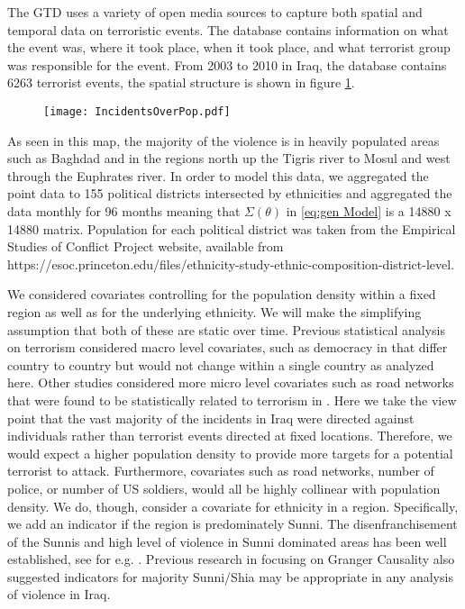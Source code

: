 \documentclass[11pt]{isuthesis}
\begin{document}
The GTD uses a variety of open media sources to capture both spatial and temporal data on terroristic events.  The database contains information on what the event was, where it took place, when it took place, and what terrorist group was responsible for the event.  From 2003 to 2010 in Iraq, the database contains 6263 terrorist events, the spatial structure is shown in figure \ref{SpaceIZ}.  

\begin{figure}[h] %
	\begin{center}
		\vspace{6pc}
		\texttt{[image: IncidentsOverPop.pdf]}
		\label{SpaceIZ}
	\end{center}
\end{figure} 

As seen in this map, the majority of the violence is in heavily populated areas such as Baghdad and in the regions north up the Tigris river to Mosul and west through the Euphrates river.  In order to model this data, we aggregated the point data to 155 political districts intersected by ethnicities and aggregated the data monthly for 96 months meaning that $\Sigma(\theta)$ in \eqref{eq:gen Model} is a 14880 x 14880 matrix.  Population for each political district was taken from the Empirical Studies of Conflict Project website, available from https://esoc.princeton.edu/files/ethnicity-study-ethnic-composition-district-level.  

We considered covariates controlling for the population density within a fixed region as well as for the underlying ethnicity.  We will make the simplifying assumption that both of these are static over time.  Previous statistical analysis on terrorism considered macro level covariates, such as democracy in \cite{python2016bayesian} that differ country to country but would not change within a single country as analyzed here.  Other studies considered more micro level covariates such as road networks that were found to be statistically related to terrorism in \cite{braithwaite2015battle}.  Here we take the view point that the vast majority of the incidents in Iraq were directed against individuals rather than terrorist events directed at fixed locations.  Therefore, we would expect a higher population density to provide more targets for a potential terrorist to attack.  Furthermore, covariates such as road networks, number of police, or number of US soldiers, would all be highly collinear with population density.  We do, though, consider a covariate for ethnicity in a region.  Specifically, we add an indicator if the region is predominately Sunni.    The disenfranchisement of the Sunnis and high level of violence in Sunni dominated areas has been well established, see for e.g. \cite{baker2006iraq}.  Previous research in \cite{linke2012space} focusing on Granger Causality also suggested indicators for majority Sunni/Shia may be appropriate in any analysis of violence in Iraq.
\end{document}
